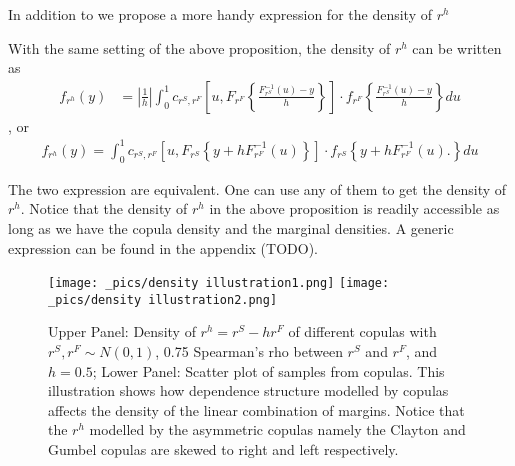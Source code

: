 \documentclass[square]{article} %
\theoremstyle{plain}
\theoremstyle{definition} %
\begin{document}
In addition to \cite{Barbi2014} we propose a more handy expression for the density of $r^h$

\begin{prop} With the same setting of the above proposition, the density of $r^h$ can be written as
  \begin{align}
  f_{r^h}(y) &= \left|\frac{1}{h}\right|\int_0^1 c_{r^S, r^F} \left[u,
  F_{r^F}\left\{\frac{F^{-1}_{r^S}(u)-y}{h}\right\}
  \right]
   \cdot
  f_{r^F}
  \left\{\frac{F^{-1}_{r^S}(u)-y}{h}\right\} du \label{eq:density1}
  \end{align}, or
    \begin{align}
      f_{r^h}(y)
      = \int_0^1 c_{r^S, r^F} \left[u,
      F_{r^S}\left\{y + h F^{-1}_{r^F}(u)\right\}
      \right]
       \cdot
      f_{r^S}
      \left\{
      y+ hF^{-1}_{r^F}(u).
      \right\} du\label{eq:density2}
  \end{align}
  \end{prop}
The two expression are equivalent.
One can use any of them to get the density of $r^h$.
Notice that the density of $r^h$ in the above proposition is readily accessible as long as we have
the copula density and the marginal densities.
A generic expression can be found in the appendix (TODO).
\begin{figure}[h]
\texttt{[image: \_pics/density illustration1.png]}
\texttt{[image: \_pics/density illustration2.png]}
  \caption{Upper Panel: Density of $r^h= r^S - hr^F$ of different copulas with
  $r^S, r^F \sim N(0,1)$,
  0.75 Spearman's rho between $r^S$ and $r^F$, and $h=0.5$;
  Lower Panel: Scatter plot of samples from copulas.
  This illustration shows how dependence structure modelled by copulas affects the density of the linear combination
  of margins.
  Notice that the $r^h$ modelled by the asymmetric copulas namely the Clayton and Gumbel copulas are skewed to right
  and left respectively.}
\label{fig:density illustration}
\end{figure}
\end{document}
